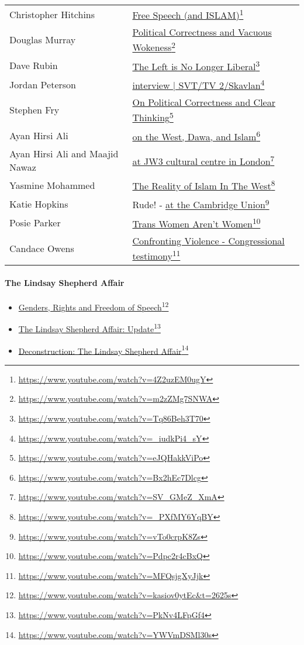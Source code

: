 \documentclass[14pt,titlepage]{extarticle}
\newcommand{\hreg}[2]{\href{#1}{#2}\footnote{\url{#1}}}
\begin{document}
\begin{longtable}{l l}
Christopher Hitchins & \hreg{https://www.youtube.com/watch?v=4Z2uzEM0ugY}{Free Speech (and ISLAM)}\\
Douglas Murray & \hreg{https://www.youtube.com/watch?v=m2zZMg7SNWA}{Political Correctness and Vacuous Wokeness}\\
Dave Rubin & \hreg{https://www.youtube.com/watch?v=Tq86Beh3T70}{The Left is No Longer Liberal}\\
Jordan Peterson & \hreg{https://www.youtube.com/watch?v=_iudkPi4_sY}{interview | SVT/TV 2/Skavlan}\\
Stephen Fry & \hreg{https://www.youtube.com/watch?v=eJQHakkViPo}{On Political Correctness and Clear Thinking}\\
  Ayan Hirsi Ali & \hreg{https://www.youtube.com/watch?v=Bx2hEc7Dlcg}{on the West, Dawa, and Islam}\\
  Ayan Hirsi Ali and Maajid Nawaz & \hreg{https://www.youtube.com/watch?v=SV_GMeZ_XmA}{at JW3 cultural centre in London}\\
Yasmine Mohammed & \hreg{https://www.youtube.com/watch?v=_PXfMY6YqBY}{The Reality of Islam In The West}\\
Katie Hopkins & Rude! - \hreg{https://www.youtube.com/watch?v=vTo0crpK8Zs}{at the Cambridge Union}\\
Posie Parker & \hreg{https://www.youtube.com/watch?v=Pdpc2r4cBxQ}{Trans Women Aren't Women}\\
Candace Owens & \hreg{https://www.youtube.com/watch?v=MFQsjgXyJjk}{Confronting Violence - Congressional testimony}\\
\end{longtable}

\paragraph{The Lindsay Shepherd Affair}

\begin{itemize}
\item \hreg{https://www.youtube.com/watch?v=kasiov0ytEc&t=2625s}{Genders, Rights and Freedom of Speech}
\item \hreg{https://www.youtube.com/watch?v=PkNv4LFpGf4}{The Lindsay Shepherd Affair: Update}
\item \hreg{https://www.youtube.com/watch?v=YWVmDSMl30s}{Deconstruction: The Lindsay Shepherd Affair}
\end{itemize}
\end{document}
